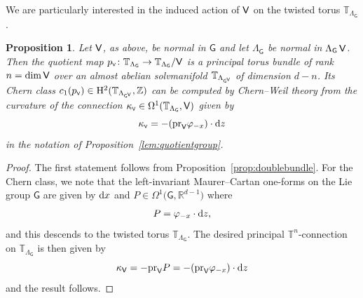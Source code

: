 \documentclass[10pt,a4paper]{amsart}
\numberwithin{equation}{section}
\newcommand{\Z}{\zed}
\def\dd{{\rm d}}
\def\V{{\sf V}}
\newcommand{\sfG}{\mathsf{G}}
\newcommand{\rmH}{{\rm H}}
\newcommand{\R}{\real}
\newcommand{\zed}{{\mathbb Z}} %
\newcommand{\real}{{\mathbb R}} %
\newcommand{\torus}{{\mathbb T}} %
\newtheorem{Proposition}[Theorem]{Proposition}
 { \theoremstyle{definition}
\newtheorem{Definition}[Theorem]{Definition}
\newtheorem{Note}[Theorem]{Note}
\newtheorem{Example}[Theorem]{Example}
\newtheorem{Remark}[Theorem]{Remark} }
\begin{document}
We are particularly interested in the induced action of $\V$ on the twisted torus $\torus_{\Lambda_\sfG}$.

\begin{Proposition}\label{lem:quotienttorus}
Let $\V$, as above, be normal in $\sfG$ and let $\Lambda_\sfG$ be
normal in $\Lambda_\sfG\,\V$. Then the quotient map
$p_{\text{\tiny{$\V$}}}\colon \torus_{\Lambda_\sfG}\to\torus_{\Lambda_\sfG}/\V$
is a principal torus bundle of rank~$n=\dim \V$ over an almost abelian
solvmanifold $\torus_{\Lambda_{\sfG^{\text{\tiny$\V$}}}}$ of
dimension $d{-}n$. Its Chern class
$c_1(p_{\text{\tiny{$\V$}}})\in\rmH^2(\torus_{\Lambda_{\sfG^{\text{\tiny$\V$}}}},\Z)$
can be computed by Chern--Weil theory from the curvature of the
connection $\kappa_{\text{\tiny{$\V$}}}\in\Omega^1(\torus_{\Lambda_\sfG},\V)$ given by
\[
\kappa_{\text{\tiny{$\V$}}} = - ({\rm pr}_\V \varphi_{-x})\cdot \dd z
\]
in the notation of Proposition~{\rm \ref{lem:quotientgroup}}.
\end{Proposition}
\begin{proof}
The first statement follows from Proposition~\ref{prop:doublebundle}.
For the Chern class, we note that the left-invariant Maurer--Cartan
one-forms on the Lie group $\sfG$ are given by $\dd x$ and
$P\in\Omega^1\big(\sfG,\R^{d-1}\big)$ where
\[
P = \varphi_{-x}\cdot \dd z ,
\]
and this descends to the twisted torus $\torus_{\Lambda_\sfG}$.
The desired principal $\torus^n$-connection on $\torus_{\Lambda_\sfG}$
is then given by
\[
\kappa_\V=-{\rm pr}_\V P = -({\rm pr}_\V \varphi_{-x})\cdot \dd z
\]
and the result follows.
\end{proof}
\end{document}

